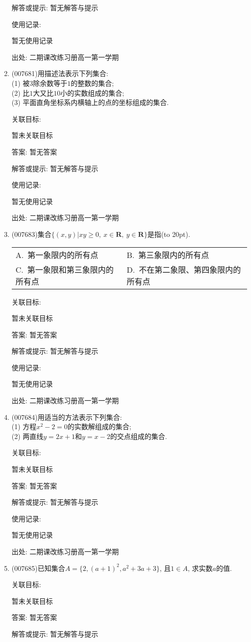 \documentclass[10pt,a4paper]{article}
\newcommand{\bracket}[1]{(\hbox to #1pt{})}
\newcommand{\twoch}[4]{\par\begin{tabular}{p{.46\textwidth}p{.46\textwidth}}
A.~#1& B.~#2\\
C.~#3& D.~#4
\end{tabular}}
\begin{document}
\begin{enumerate}[1.]
解答或提示: 暂无解答与提示

使用记录:

暂无使用记录


出处: 二期课改练习册高一第一学期
\item { (007681)}用描述法表示下列集合:\\
(1) 被$3$除余数等于$1$的整数的集合;\\
(2) 比$1$大又比$10$小的实数组成的集合;\\
(3) 平面直角坐标系内横轴上的点的坐标组成的集合.


关联目标:

暂未关联目标

答案: 暂无答案

解答或提示: 暂无解答与提示

使用记录:

暂无使用记录


出处: 二期课改练习册高一第一学期
\item { (007683)}集合$\{(x,y)|xy\ge 0, \ x\in \mathbf{R}, \ y\in \mathbf{R}\}$是指\bracket{20}.
\twoch{第一象限内的所有点}{第三象限内的所有点}{第一象限和第三象限内的所有点}{不在第二象限、第四象限内的所有点}


关联目标:

暂未关联目标

答案: 暂无答案

解答或提示: 暂无解答与提示

使用记录:

暂无使用记录


出处: 二期课改练习册高一第一学期
\item { (007684)}用适当的方法表示下列集合:\\
(1) 方程$x^2-2=0$的实数解组成的集合;\\
(2) 两直线$y=2x+1$和$y=x-2$的交点组成的集合.


关联目标:

暂未关联目标

答案: 暂无答案

解答或提示: 暂无解答与提示

使用记录:

暂无使用记录


出处: 二期课改练习册高一第一学期
\item { (007685)}已知集合$A=\{2,(a+1)^2,a^2+3a+3\}$, 且$1\in A$, 求实数$a$的值.


关联目标:

暂未关联目标

答案: 暂无答案

解答或提示: 暂无解答与提示


\end{enumerate}
\end{document}
